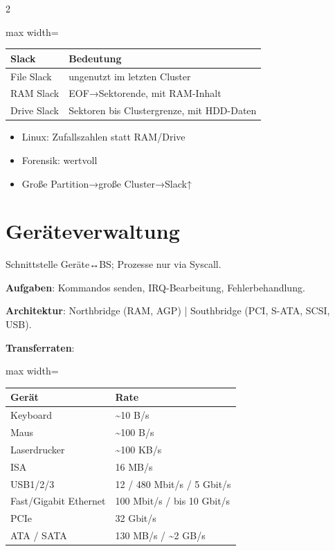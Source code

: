 \documentclass[10pt, a4paper]{article}
\begin{document}
\begin{multicols}{2}
{\small
\begin{adjustbox}{max width=\linewidth}
{\scriptsize
\begin{tabular}{ll}
\toprule
\textbf{Slack} & \textbf{Bedeutung} \\
\midrule
File Slack & ungenutzt im letzten Cluster \\
RAM Slack & EOF→Sektorende, mit RAM-Inhalt \\
Drive Slack & Sektoren bis Clustergrenze, mit HDD-Daten \\
\bottomrule
\end{tabular}
}
\end{adjustbox}
}


\begin{itemize}
  \item Linux: Zufallszahlen statt RAM/Drive
  \item Forensik: wertvoll
  \item Große Partition→große Cluster→Slack↑
\end{itemize}


\section{Geräteverwaltung}

Schnittstelle Geräte↔BS; Prozesse nur via Syscall.


\textbf{Aufgaben}: Kommandos senden, IRQ-Bearbeitung, Fehlerbehandlung.


\textbf{Architektur}: Northbridge (RAM, AGP) | Southbridge (PCI, S-ATA, SCSI, USB).


\textbf{Transferraten}:


{\small
\begin{adjustbox}{max width=\linewidth}
{\scriptsize
\begin{tabular}{ll}
\toprule
\textbf{Gerät} & \textbf{Rate} \\
\midrule
Keyboard & \textasciitilde{}10 B/s \\
Maus & \textasciitilde{}100 B/s \\
Laserdrucker & \textasciitilde{}100 KB/s \\
ISA & 16 MB/s \\
USB1/2/3 & 12 / 480 Mbit/s / 5 Gbit/s \\
Fast/Gigabit Ethernet & 100 Mbit/s / bis 10 Gbit/s \\
PCIe & 32 Gbit/s \\
ATA / SATA & 130 MB/s / \textasciitilde{}2 GB/s \\
\bottomrule
\end{tabular}
}
\end{adjustbox}
}




\end{multicols}
\end{document}
